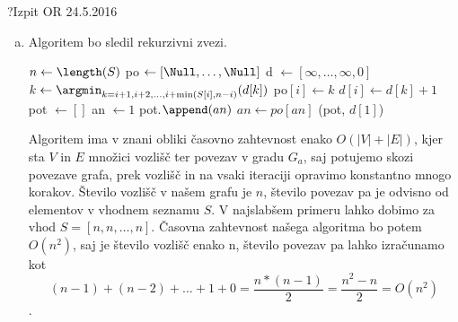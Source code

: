 \begin{naloga}{?}{Izpit OR 24.5.2016}
\begin{odgovor}
\begin{enumerate}[a)]
\item Algoritem bo sledil rekurzivni zvezi.

\begin{small}
\begin{algorithmic}
	\State $n \gets \length(S)$
	\State po $\gets [\Null, \dots, \Null]$
	\State d $\gets [\infty, \dots, \infty, 0]$
		\State $k \gets \argmin_{k = i + 1, i + 2, \dots, i + \min(S[i], n - i )}(d[k])$
		\State po$[i] \gets k$
		\State $d[i] \gets d[k] + 1$
	\EndFor
	\State pot $\gets []$
	\State an $\gets 1$
		\State pot.$\append(an)$
		\State $an \gets po[an]$
	\EndWhile
	\State \Return (pot, $d[1]$)
\EndFunction
\end{algorithmic}
\end{small}

Algoritem ima v znani obliki časovno zahtevnost enako $O(|V| + |E|)$, kjer sta $V$ in $E$ množici vozlišč ter povezav v gradu $G_a$, 
saj potujemo skozi povezave grafa, prek vozlišč in na vsaki iteraciji opravimo konstantno mnogo korakov.
Število vozlišč v našem grafu je $n$, število povezav pa je odvisno od elementov v vhodnem seznamu $S$.
V najslabšem primeru lahko dobimo za vhod $S = [n, n, \dots, n]$.
Časovna zahtevnost našega algoritma bo potem $O(n^2)$, saj je število vozlišč enako n, število povezav pa lahko izračunamo kot 
$$(n - 1) + (n - 2) +  \dots + 1 + 0 = \frac{n * (n - 1)}{2} = \frac{n ^2 - n}{2} = O(n^2)$$.

\end{enumerate}

\end{odgovor}
\end{naloga}
